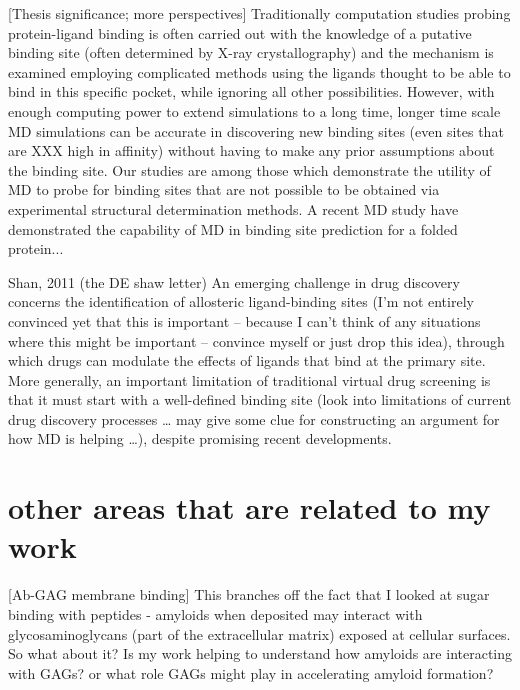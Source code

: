 [Thesis significance; more perspectives] Traditionally computation studies probing protein-ligand binding is often carried out with the knowledge of a putative binding site (often determined by X-ray crystallography) and the mechanism is examined employing complicated methods using the ligands thought to be able to bind in this specific pocket, while ignoring all other possibilities.  However, with enough computing power to extend simulations to a long time, longer time scale MD simulations can be accurate in discovering new binding sites (even sites that are XXX high in affinity) without having to make any prior assumptions about the binding site. Our studies are among those which demonstrate the utility of MD to probe for binding sites that are not possible to be obtained via experimental structural determination methods.  A recent MD study have demonstrated the capability of MD in binding site prediction for a folded protein...\cite{Shan:2011bo}

Shan, 2011 (the DE shaw letter) An emerging challenge in drug discovery concerns the identification of allosteric ligand-binding sites (I’m not entirely convinced yet that this is important -- because I can’t think of any situations where this might be important -- convince myself or just drop this idea), through which drugs can modulate the effects of ligands that bind at the primary site.  More generally, an important limitation of traditional virtual drug screening is that it must start with a well-defined binding site (look into limitations of current drug discovery processes … may give some clue for constructing an argument for how MD is helping …), despite promising recent developments.\cite{Hetenyi, C.; van der Spoel, D. FEBS Lett. 2006, 580, 1447. (11) Davis,I.W.;Raha,K.;Head,M.S.;Baker,D.ProteinSci.2009, 18, 1998. }


\section{other areas that are related to my work}
[Ab-GAG membrane binding] This branches off the fact that I looked at sugar binding with peptides - amyloids when deposited may interact with glycosaminoglycans (part of the extracellular matrix) exposed at cellular surfaces. So what about it? Is my work helping to understand how amyloids are interacting with GAGs? or what role GAGs might play in accelerating amyloid formation?

